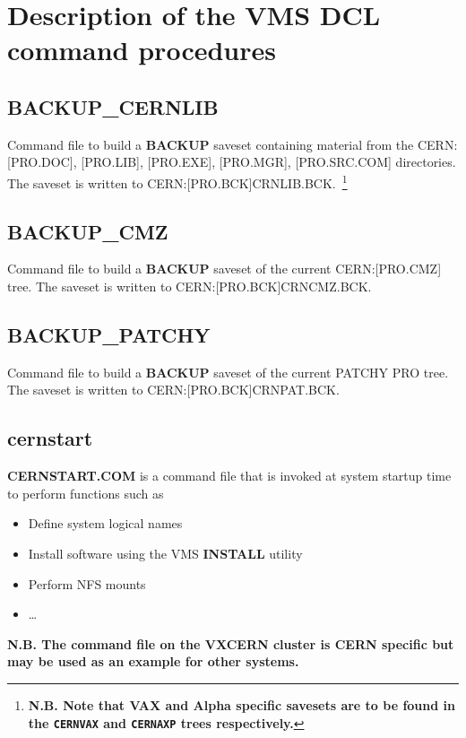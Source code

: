 \chapter{Description of the VMS DCL command procedures}
\label{sect-DCL}

\section{BACKUP\_CERNLIB}

Command file to build a {\bf BACKUP} saveset containing material
from the CERN:[PRO.DOC], [PRO.LIB], [PRO.EXE], [PRO.MGR], [PRO.SRC.COM]
directories. The saveset is written to 
CERN:[PRO.BCK]CRNLIB.BCK.~\footnote{{\bf N.B. Note that VAX and Alpha
specific savesets are to be found in the {\tt CERNVAX} and {\tt CERNAXP}
trees respectively.}}

\section{BACKUP\_CMZ}

Command file to build a {\bf BACKUP} saveset of the current
CERN:[PRO.CMZ] tree. The saveset is written to
CERN:[PRO.BCK]CRNCMZ.BCK.

\section{BACKUP\_PATCHY}

Command file to build a {\bf BACKUP} saveset of the current
PATCHY PRO tree. The saveset is written to CERN:[PRO.BCK]CRNPAT.BCK.

\section{cernstart}

{\bf CERNSTART.COM} is a command file that is invoked at system startup
time to perform functions such as

\begin{itemize}
\item
Define system logical names
\item
Install software using the VMS {\bf INSTALL} utility
\item
Perform NFS mounts
\item
\ldots
\end{itemize}

{\bf N.B. The command file on the VXCERN cluster is CERN specific
but may be used as an example for other systems.}

